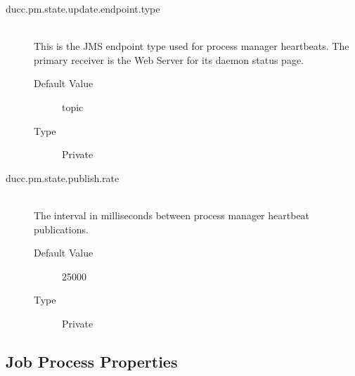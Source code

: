 \begin{description}
      \item[ducc.pm.state.update.endpoint.type] \hfill \\
        This is the JMS endpoint type used for process manager heartbeats. The primary receiver 
        is the Web Server for its daemon status page. 
        \begin{description}
          \item[Default Value] topic 
          \item[Type] Private 
        \end{description}
        
      \item[ducc.pm.state.publish.rate] \hfill \\
        The interval in milliseconds between process manager heartbeat publications.
        \begin{description}
        \item[Default Value] 25000 
        \item[Type] Private 
        \end{description}
        

      \end{description}
      

\subsection{Job Process Properties}

